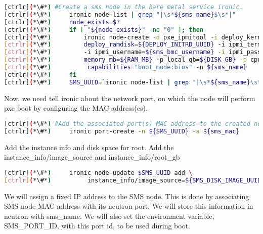
\begin{lstlisting}[language=bash,keywords={}]
[ctrlr](*\#*) #Create a sms node in the bare metal service ironic.
[ctrlr](*\#*)     ironic node-list | grep "|\s*${sms_name}$\s*|"
[ctrlr](*\#*)     node_exists=$?
[ctrlr](*\#*)     if [ "${node_exists}" -ne "0" ]; then 
[ctrlr](*\#*)         ironic node-create -d pxe_ipmitool -i deploy_kernel=${DEPLOY_VMLINUZ_UUID} -i \
[ctrlr](*\#*)         deploy_ramdisk=${DEPLOY_INITRD_UUID} -i ipmi_terminal_port=8023 -i ipmi_address=${sms_bmc} \
[ctrlr](*\#*)         -i ipmi_username=${sms_bmc_username} -i ipmi_password=${sms_bmc_password} -p cpus=${CPU} -p \
[ctrlr](*\#*)         memory_mb=${RAM_MB} -p local_gb=${DISK_GB} -p cpu_arch=${ARCH} -p \
[ctrlr](*\#*)          capabilities="boot_mode:bios" -n ${sms_name}
[ctrlr](*\#*)     fi
[ctrlr](*\#*)     SMS_UUID=`ironic node-list | grep "|\s*${sms_name}\s*|" | awk '{print $2}'`
\end{lstlisting} 

	Now, we need tell ironic about the network port, on which the node will perform pxe boot by configuring the MAC address(es). 



\begin{lstlisting}[language=bash,keywords={}]
[ctrlr](*\#*) #Add the associated port(s) MAC address to the created node(s)
[ctrlr](*\#*)     ironic port-create -n ${SMS_UUID} -a ${sms_mac}
\end{lstlisting} 

Add the instance info and disk space for root. \newline
	Add the instance\_info/image\_source and instance\_info/root\_gb
    

\begin{lstlisting}[language=bash,keywords={}]
[ctrlr](*\#*)     ironic node-update $SMS_UUID add \
[ctrlr](*\#*)          instance_info/image_source=${SMS_DISK_IMAGE_UUID} instance_info/root_gb=50
\end{lstlisting} 


	We will assign a fixed IP address to the SMS node. This is done by associating SMS node MAC address with its neutron port. We will store this information in neutron with sms\_name. We will also set the environment variable, SMS\_PORT\_ID, with this port id, to be used during boot.

